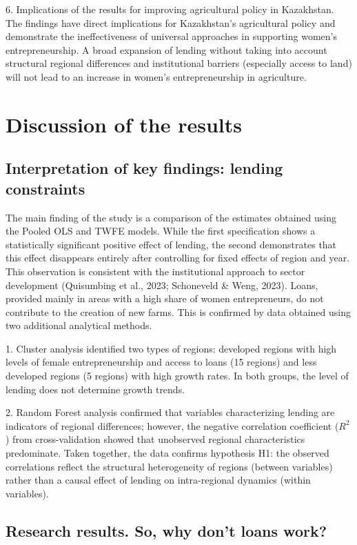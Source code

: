 ﻿\documentclass[sn-mathphys-num]{sn-jnl}
\newcommand{\hl}[1]{#1}
\begin{document}
6. Implications of the results for improving agricultural policy in
Kazakhstan. The findings have direct implications for Kazakhstan's
agricultural policy and demonstrate the ineffectiveness of universal
approaches in supporting women's entrepreneurship. A broad expansion of
lending without taking into account structural regional differences and
institutional barriers (especially access to land) will not lead to an
increase in women's entrepreneurship in agriculture.

\section{Discussion of the results}

\subsection{Interpretation of key findings: lending constraints}

The main finding of the study is a comparison of the estimates obtained
using the Pooled OLS and TWFE models. While the first specification
shows a statistically significant positive effect of lending, the second
demonstrates that this effect disappears entirely after controlling for
fixed effects of region and year. This observation is consistent with
the institutional approach to sector development (\hl{Quisumbing et al.,
2023; Schoneveld \& Weng, 2023}). Loans, provided mainly in areas with a
high share of women entrepreneurs, do not contribute to the creation of
new farms. This is confirmed by data obtained using two additional
analytical methods.

1. Cluster analysis identified two types of regions: developed regions
with high levels of female entrepreneurship and access to loans (15
regions) and less developed regions (5 regions) with high growth rates.
In both groups, the level of lending does not determine growth trends.

2. Random Forest analysis confirmed that variables characterizing
lending are indicators of regional differences; however, the negative
correlation coefficient ($R^2$) from cross-validation showed that
unobserved regional characteristics predominate. Taken together, the
data confirms hypothesis H1: the observed correlations reflect the
structural heterogeneity of regions (between variables) rather than a
causal effect of lending on intra-regional dynamics (within variables).

\subsection{Research results. So, why don't loans work?}
\end{document}
